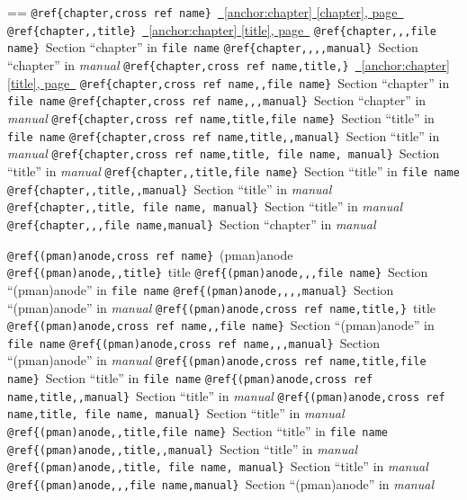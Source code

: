 \documentclass{book}
\makeatletter
\newenvironment{Texinfopreformatted}{%
  \par\GNUTobeylines\obeyspaces\frenchspacing\parskip=\z@\parindent=\z@}{}
{\catcode`\^^M=13 \gdef\GNUTobeylines{\catcode`\^^M=13 \def^^M{\null\par}}}
\newenvironment{Texinfoindented}{\begin{list}{}{}\item\relax}{\end{list}}
\renewcommand{\_}{\Texinfounderscore\discretionary{}{}{}}
\makeatother
\begin{document}
{{\begin{Texinfoindented}
\begin{Texinfopreformatted}
\texttt{@ref\{chapter,cross ref name\}}\ \hyperref[anchor:chapter]{\chaptername~\ref*{anchor:chapter} [chapter], page~\pageref*{anchor:chapter}}
\texttt{@ref\{chapter{,}{,}title\}}\ \hyperref[anchor:chapter]{\chaptername~\ref*{anchor:chapter} [title], page~\pageref*{anchor:chapter}}
\texttt{@ref\{chapter{,}{,},file name\}}\ Section ``chapter'' in \texttt{file name}
\texttt{@ref\{chapter{,}{,}{,}{,}manual\}}\ Section ``chapter'' in \textsl{manual}
\texttt{@ref\{chapter,cross ref name,title,\}}\ \hyperref[anchor:chapter]{\chaptername~\ref*{anchor:chapter} [title], page~\pageref*{anchor:chapter}}
\texttt{@ref\{chapter,cross ref name{,}{,}file name\}}\ Section ``chapter'' in \texttt{file name}
\texttt{@ref\{chapter,cross ref name{,}{,},manual\}}\ Section ``chapter'' in \textsl{manual}
\texttt{@ref\{chapter,cross ref name,title,file name\}}\ Section ``title'' in \texttt{file name}
\texttt{@ref\{chapter,cross ref name,title{,}{,}manual\}}\ Section ``title'' in \textsl{manual}
\texttt{@ref\{chapter,cross ref name,title,\ file name,\ manual\}}\ Section ``title'' in \textsl{manual}
\texttt{@ref\{chapter{,}{,}title,file name\}}\ Section ``title'' in \texttt{file name}
\texttt{@ref\{chapter{,}{,}title{,}{,}manual\}}\ Section ``title'' in \textsl{manual}
\texttt{@ref\{chapter{,}{,}title,\ file name,\ manual\}}\ Section ``title'' in \textsl{manual}
\texttt{@ref\{chapter{,}{,},file name,manual\}}\ Section ``chapter'' in \textsl{manual}


\texttt{@ref\{(pman)anode,cross ref name\}}\ (pman)anode
\texttt{@ref\{(pman)anode{,}{,}title\}}\ title
\texttt{@ref\{(pman)anode{,}{,},file name\}}\ Section ``(pman)anode'' in \texttt{file name}
\texttt{@ref\{(pman)anode{,}{,}{,}{,}manual\}}\ Section ``(pman)anode'' in \textsl{manual}
\texttt{@ref\{(pman)anode,cross ref name,title,\}}\ title
\texttt{@ref\{(pman)anode,cross ref name{,}{,}file name\}}\ Section ``(pman)anode'' in \texttt{file name}
\texttt{@ref\{(pman)anode,cross ref name{,}{,},manual\}}\ Section ``(pman)anode'' in \textsl{manual}
\texttt{@ref\{(pman)anode,cross ref name,title,file name\}}\ Section ``title'' in \texttt{file name}
\texttt{@ref\{(pman)anode,cross ref name,title{,}{,}manual\}}\ Section ``title'' in \textsl{manual}
\texttt{@ref\{(pman)anode,cross ref name,title,\ file name,\ manual\}}\ Section ``title'' in \textsl{manual}
\texttt{@ref\{(pman)anode{,}{,}title,file name\}}\ Section ``title'' in \texttt{file name}
\texttt{@ref\{(pman)anode{,}{,}title{,}{,}manual\}}\ Section ``title'' in \textsl{manual}
\texttt{@ref\{(pman)anode{,}{,}title,\ file name,\ manual\}}\ Section ``title'' in \textsl{manual}
\texttt{@ref\{(pman)anode{,}{,},file name,manual\}}\ Section ``(pman)anode'' in \textsl{manual}



\end{Texinfopreformatted}
\end{Texinfoindented}}}
\end{document}
